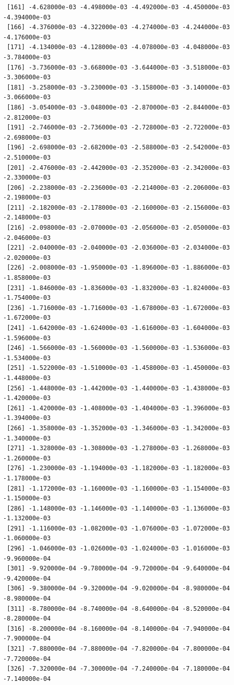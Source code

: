 \documentclass[12pt,letterpaper]{article}\usepackage[]{graphicx}\usepackage[]{color}
\begin{document}
\begin{lstlisting}
 [161] -4.628000e-03 -4.498000e-03 -4.492000e-03 -4.450000e-03 -4.394000e-03
 [166] -4.376000e-03 -4.322000e-03 -4.274000e-03 -4.244000e-03 -4.176000e-03
 [171] -4.134000e-03 -4.128000e-03 -4.078000e-03 -4.048000e-03 -3.784000e-03
 [176] -3.736000e-03 -3.668000e-03 -3.644000e-03 -3.518000e-03 -3.306000e-03
 [181] -3.258000e-03 -3.230000e-03 -3.158000e-03 -3.140000e-03 -3.066000e-03
 [186] -3.054000e-03 -3.048000e-03 -2.870000e-03 -2.844000e-03 -2.812000e-03
 [191] -2.746000e-03 -2.736000e-03 -2.728000e-03 -2.722000e-03 -2.698000e-03
 [196] -2.698000e-03 -2.682000e-03 -2.588000e-03 -2.542000e-03 -2.510000e-03
 [201] -2.476000e-03 -2.442000e-03 -2.352000e-03 -2.342000e-03 -2.330000e-03
 [206] -2.238000e-03 -2.236000e-03 -2.214000e-03 -2.206000e-03 -2.198000e-03
 [211] -2.182000e-03 -2.178000e-03 -2.160000e-03 -2.156000e-03 -2.148000e-03
 [216] -2.098000e-03 -2.070000e-03 -2.056000e-03 -2.050000e-03 -2.046000e-03
 [221] -2.040000e-03 -2.040000e-03 -2.036000e-03 -2.034000e-03 -2.020000e-03
 [226] -2.008000e-03 -1.950000e-03 -1.896000e-03 -1.886000e-03 -1.858000e-03
 [231] -1.846000e-03 -1.836000e-03 -1.832000e-03 -1.824000e-03 -1.754000e-03
 [236] -1.716000e-03 -1.716000e-03 -1.678000e-03 -1.672000e-03 -1.672000e-03
 [241] -1.642000e-03 -1.624000e-03 -1.616000e-03 -1.604000e-03 -1.596000e-03
 [246] -1.566000e-03 -1.560000e-03 -1.560000e-03 -1.536000e-03 -1.534000e-03
 [251] -1.522000e-03 -1.510000e-03 -1.458000e-03 -1.450000e-03 -1.448000e-03
 [256] -1.448000e-03 -1.442000e-03 -1.440000e-03 -1.438000e-03 -1.420000e-03
 [261] -1.420000e-03 -1.408000e-03 -1.404000e-03 -1.396000e-03 -1.394000e-03
 [266] -1.358000e-03 -1.352000e-03 -1.346000e-03 -1.342000e-03 -1.340000e-03
 [271] -1.328000e-03 -1.308000e-03 -1.278000e-03 -1.268000e-03 -1.260000e-03
 [276] -1.230000e-03 -1.194000e-03 -1.182000e-03 -1.182000e-03 -1.178000e-03
 [281] -1.172000e-03 -1.160000e-03 -1.160000e-03 -1.154000e-03 -1.150000e-03
 [286] -1.148000e-03 -1.146000e-03 -1.140000e-03 -1.136000e-03 -1.132000e-03
 [291] -1.116000e-03 -1.082000e-03 -1.076000e-03 -1.072000e-03 -1.060000e-03
 [296] -1.046000e-03 -1.026000e-03 -1.024000e-03 -1.016000e-03 -9.960000e-04
 [301] -9.920000e-04 -9.780000e-04 -9.720000e-04 -9.640000e-04 -9.420000e-04
 [306] -9.380000e-04 -9.320000e-04 -9.020000e-04 -8.980000e-04 -8.980000e-04
 [311] -8.780000e-04 -8.740000e-04 -8.640000e-04 -8.520000e-04 -8.280000e-04
 [316] -8.200000e-04 -8.160000e-04 -8.140000e-04 -7.940000e-04 -7.900000e-04
 [321] -7.880000e-04 -7.880000e-04 -7.820000e-04 -7.800000e-04 -7.720000e-04
 [326] -7.320000e-04 -7.300000e-04 -7.240000e-04 -7.180000e-04 -7.140000e-04

\end{lstlisting}
\end{document}
